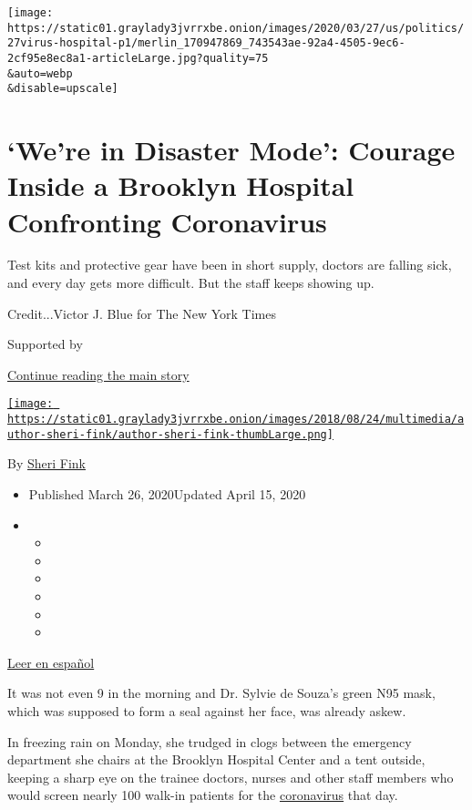\texttt{[image: https://static01.graylady3jvrrxbe.onion/images/2020/03/27/us/politics/27virus-hospital-p1/merlin\_170947869\_743543ae-92a4-4505-9ec6-2cf95e8ec8a1-articleLarge.jpg?quality=75\\\&auto=webp\\\&disable=upscale]}

\hypertarget{were-in-disaster-mode-courage-inside-a-brooklyn-hospital-confronting-coronavirus}{%
\section{`We're in Disaster Mode': Courage Inside a Brooklyn Hospital
Confronting
Coronavirus}\label{were-in-disaster-mode-courage-inside-a-brooklyn-hospital-confronting-coronavirus}}

Test kits and protective gear have been in short supply, doctors are
falling sick, and every day gets more difficult. But the staff keeps
showing up.

Credit...Victor J. Blue for The New York Times

Supported by

\protect\hyperlink{after-sponsor}{Continue reading the main story}

\href{https://www.nytimes3xbfgragh.onion/by/sheri-fink}{\texttt{[image: https://static01.graylady3jvrrxbe.onion/images/2018/08/24/multimedia/author-sheri-fink/author-sheri-fink-thumbLarge.png]}}

By \href{https://www.nytimes3xbfgragh.onion/by/sheri-fink}{Sheri Fink}

\begin{itemize}
\item
  Published March 26, 2020Updated April 15, 2020
\item
  \begin{itemize}
  \item
  \item
  \item
  \item
  \item
  \item
  \end{itemize}
\end{itemize}

\href{https://www.nytimes3xbfgragh.onion/es/2020/03/30/espanol/mundo/coronavirus-hospitales.html}{Leer
en español}

It was not even 9 in the morning and Dr. Sylvie de Souza's green N95
mask, which was supposed to form a seal against her face, was already
askew.

In freezing rain on Monday, she trudged in clogs between the emergency
department she chairs at the Brooklyn Hospital Center and a tent
outside, keeping a sharp eye on the trainee doctors, nurses and other
staff members who would screen nearly 100 walk-in patients for the
\href{https://www.nytimes3xbfgragh.onion/2020/04/15/podcasts/the-daily/coronavirus-brooklyn-hospital.html}{coronavirus}
that day.

